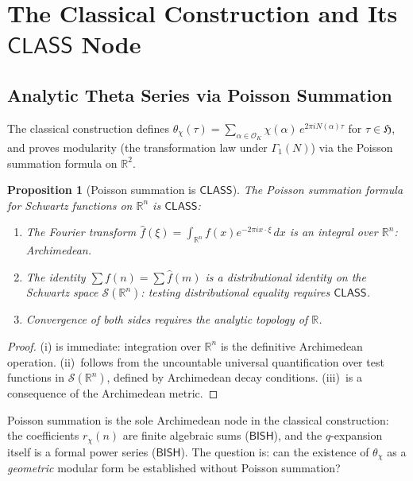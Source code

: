 \documentclass[11pt,a4paper]{article}
\theoremstyle{plain}
\newtheorem{proposition}[theorem]{Proposition}
\theoremstyle{definition}
\newcommand{\BISH}{\textsf{BISH}}
\newcommand{\CLASS}{\textsf{CLASS}}
\newcommand{\R}{\mathbb{R}}
\begin{document}
\section{The Classical Construction and Its $\CLASS$ Node}\label{sec:classical}

\subsection{Analytic Theta Series via Poisson Summation}

The classical construction defines $\theta_\chi(\tau) = \sum_{\alpha \in \mathcal{O}_K} \chi(\alpha)\, e^{2\pi i N(\alpha) \tau}$ for $\tau \in \mathfrak{H}$, and proves modularity (the transformation law under $\Gamma_1(N)$) via the Poisson summation formula on $\R^2$.

\begin{proposition}[Poisson summation is $\CLASS$]\label{prop:poisson-class}
The Poisson summation formula for Schwartz functions on $\R^n$ is $\CLASS$:
\begin{enumerate}[label=(\roman*)]
\item The Fourier transform $\hat{f}(\xi) = \int_{\R^n} f(x) e^{-2\pi i x \cdot \xi}\, dx$ is an integral over $\R^n$: Archimedean.
\item The identity $\sum f(n) = \sum \hat{f}(m)$ is a distributional identity on the Schwartz space $\mathcal{S}(\R^n)$: testing distributional equality requires $\CLASS$.
\item Convergence of both sides requires the analytic topology of $\R$.
\end{enumerate}
\end{proposition}

\begin{proof}
(i) is immediate: integration over $\R^n$ is the definitive Archimedean operation. (ii)~follows from the uncountable universal quantification over test functions in $\mathcal{S}(\R^n)$, defined by Archimedean decay conditions. (iii)~is a consequence of the Archimedean metric.
\end{proof}

Poisson summation is the sole Archimedean node in the classical construction: the coefficients $r_\chi(n)$ are finite algebraic sums ($\BISH$), and the $q$-expansion itself is a formal power series ($\BISH$). The question is: can the existence of $\theta_\chi$ as a \emph{geometric} modular form be established without Poisson summation?
\end{document}
